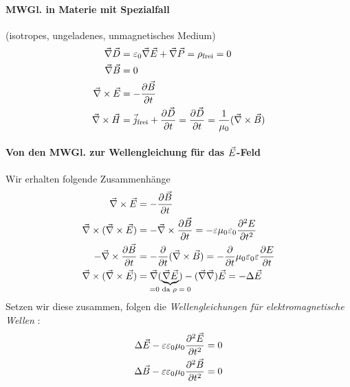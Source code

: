 \paragraph{MWGl. in Materie mit Spezialfall}(isotropes, ungeladenes, unmagnetisches Medium)
 \begin{align*}
 	\vecna\vecD&=\epso\vecna\vecE+\vecna\vecP=\rho_\text{frei}=0\\
 	\vecna\vecB&=0\\
 	\vecna\times\vecE&=-\dif[\vecB]{t}\\
 	\vecna\times\vecH&=\vecj_\text{frei}+\dif[\vecD]{t}
                        =\dif[\vecD]{t}=\frac{1}{\muo}(\vecna\times\vecB)
 \end{align*}
\paragraph{Von den MWGl. zur Wellengleichung für das $\vecE$-Feld}
Wir erhalten folgende Zusammenhänge
\begin{align*}
  \vecna \times \vecE 
  &=-\dif[\vecB]{t}
  \\
  \vecna \times (\vecna\times\vecE)
  &=-\vecna\times\dif[\vecB]{t}
    =-\eps\muo\epso\diff[E]{t}
  \\
  -\vecna \times \dif[\vecB]{t}
  &= -\dif[]{t}(\vecna\times\vecB)
    = -\dif[]{t}\muo\epso\eps\dif[E]{t}
  \\
  \vecna\times(\vecna\times\vecE)
  &=\vecna(\underbrace{\vecna\vecE}_{\mathclap{=0 \text{ da $\rho=0$}}})
    -(\vecna\vecna)\vecE
    =-\Delta\vecE
\end{align*}
Setzen wir diese zusammen, folgen die
\emph{Wellengleichungen für elektromagnetische Wellen}%
:
\begin{align*}
  \Delta\vecE-\eps\epso\muo\diff[\vecE]{t} &= 0\\
  \Delta\vecB-\eps\epso\muo\diff[\vecB]{t} &= 0
\end{align*}
